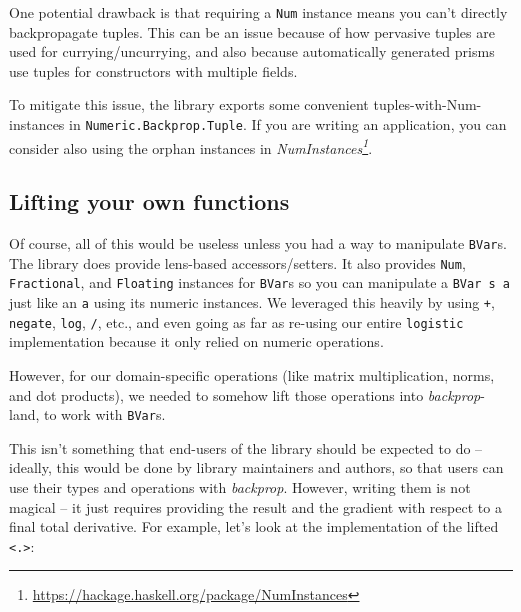 \documentclass[]{article}
\renewcommand{\href}[2]{#2\footnote{\url{#1}}}
\begin{document}
One potential drawback is that requiring a \texttt{Num} instance means you can't
directly backpropagate tuples. This can be an issue because of how pervasive
tuples are used for currying/uncurrying, and also because automatically
generated prisms use tuples for constructors with multiple fields.

To mitigate this issue, the library exports some convenient
tuples-with-Num-instances in \texttt{Numeric.Backprop.Tuple}. If you are writing
an application, you can consider also using the orphan instances in
\emph{\href{https://hackage.haskell.org/package/NumInstances}{NumInstances}}.

\subsection{Lifting your own functions}\label{lifting-your-own-functions}

Of course, all of this would be useless unless you had a way to manipulate
\texttt{BVar}s. The library does provide lens-based accessors/setters. It also
provides \texttt{Num}, \texttt{Fractional}, and \texttt{Floating} instances for
\texttt{BVar}s so you can manipulate a \texttt{BVar\ s\ a} just like an
\texttt{a} using its numeric instances. We leveraged this heavily by using
\texttt{+}, \texttt{negate}, \texttt{log}, \texttt{/}, etc., and even going as
far as re-using our entire \texttt{logistic} implementation because it only
relied on numeric operations.

However, for our domain-specific operations (like matrix multiplication, norms,
and dot products), we needed to somehow lift those operations into
\emph{backprop}-land, to work with \texttt{BVar}s.

This isn't something that end-users of the library should be expected to do --
ideally, this would be done by library maintainers and authors, so that users
can use their types and operations with \emph{backprop}. However, writing them
is not magical -- it just requires providing the result and the gradient with
respect to a final total derivative. For example, let's look at the
implementation of the lifted \texttt{\textless{}.\textgreater{}}:
\end{document}

